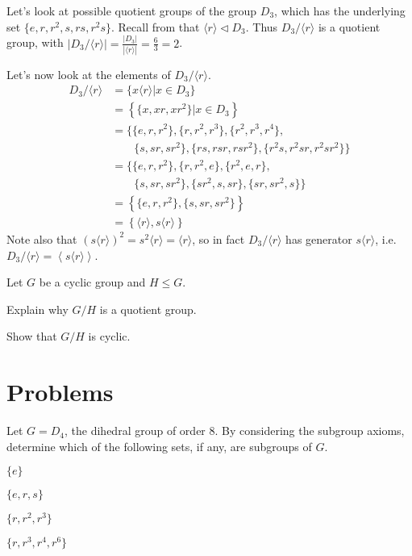 \begin{example}
    Let's look at possible quotient groups of the group $D_3$, which has the underlying set $\{e, r, r^2, s, rs, r^2s\}$. Recall from  that $\langle r \rangle \lhd D_3$. Thus $D_3 / \langle r \rangle$ is a quotient group, with $|D_3 / \langle r \rangle| = \frac{|D_3|}{|\langle r\rangle|} = \frac63 = 2$.

    Let's now look at the elements of $D_3 / \langle r \rangle$.
    \begin{align*}
        D_3 / \langle r \rangle  &= \{x\langle r \rangle \vert x \in D_3\}\\
        &= \left\{\{x, xr, xr^2\} \vert x \in D_3\right\}\\
        &= \{\{e, r, r^2\}, \{r, r^2, r^3\}, \{r^2, r^3, r^4\}, \\ &\quad\quad \{s, sr, sr^2\}, \{rs, rsr, rsr^2\}, \{r^2s, r^2sr, r^2sr^2\}\}\\
        &= \{\{e, r, r^2\}, \{r, r^2, e\}, \{r^2, e, r\}, \\ &\quad\quad \{s, sr, sr^2\}, \{sr^2, s, sr\}, \{sr, sr^2, s\}\}\\
        &= \left\{\{e, r, r^2\}, \{s, sr, sr^2\}\right\}\\
        &= \left\{\langle r\rangle, s\langle r \rangle\right\}
    \end{align*}
    Note also that $(s\langle r \rangle)^2 = s^2\langle r \rangle = \langle r\rangle$, so in fact $D_3 / \langle r \rangle$ has generator $s\langle r \rangle$, i.e. $D_3 / \langle r \rangle = \left\langle s\langle r \rangle \right\rangle$.
\end{example}

\begin{exercise}\label{exercise-quotient-group-of-cyclic-group-is-cyclic}
    Let $G$ be a cyclic group and $H \leq G$.
    \begin{partquestions}{\roman*}
        \item Explain why $G/H$ is a quotient group.
        \item Show that $G/H$ is cyclic.
    \end{partquestions}
\end{exercise}

\newpage

\section{Problems}
\begin{problem}
    Let $G = D_4$, the dihedral group of order 8. By considering the subgroup axioms, determine which of the following sets, if any, are subgroups of $G$.
    \begin{partquestions}{\alph*}
        \item $\{e\}$
        \item $\{e, r, s\}$
        \item $\{r, r^2, r^3\}$
        \item $\{r, r^3, r^4, r^6\}$
    \end{partquestions}
\end{problem}

